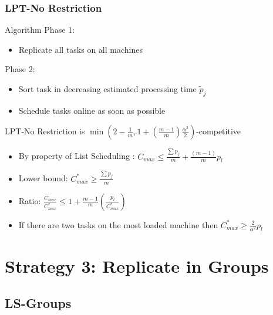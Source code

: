 \documentclass[usenames,dvipsnames]{beamer}
\begin{document}
\begin{frame}
  \frametitle{LPT-No Restriction}

  \begin{block}{Algorithm}
    Phase 1:
    \begin{itemize}
    \item Replicate all tasks on all machines
    \end{itemize}
    Phase 2:
    \begin{itemize}
    \item Sort task in decreasing estimated processing time $\tilde{p}_j$
    \item Schedule tasks online as soon as possible
    \end{itemize}
  \end{block}
  
  \pause

  \begin{block}{LPT-No Restriction is $\min(2-\frac{1}{m}, 1 + (\frac{m-1}{m}) \frac{\alpha^{2}}{2})$-competitive}
    \begin{itemize}
    \item By property of List Scheduling : $C_{max} \leq  \frac{\sum {p_j}}{m} + \frac{(m-1)}{m}p_l$
    \item Lower bound: $C_{max}^{*}\geq\frac{\sum p_j}{m}$
    \item Ratio: $\frac{C_{max}}{C_{max}^{*}} \leq 1 + {\frac{m-1}{m}}\left(\frac{p_l}{C_{max}^{*}}\right)$
    \item If there are two tasks on the most loaded machine then $C_{max}^* \geq {\frac{2}{\alpha^{2}}} p_l$
    \end{itemize}
  \end{block}  
\end{frame}

\section{Strategy 3: Replicate in Groups}

\subsection{LS-Groups}
\end{document}

